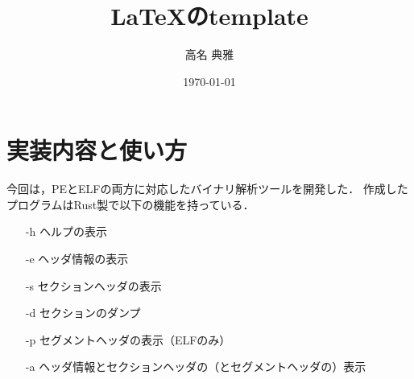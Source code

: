 \documentclass[12pt,a4paper,dvipdfmx]{jsarticle}
\title{\LaTeX のtemplate}
\author{高名 典雅}
\date{\today}
\begin{document}



\section{実装内容と使い方}
今回は，PEとELFの両方に対応したバイナリ解析ツールを開発した．
作成したプログラムはRust製で以下の機能を持っている．
\begin{itemize}
    \item[-h] ヘルプの表示
    \item[-e] ヘッダ情報の表示
    \item[-s] セクションヘッダの表示
    \item[-d] セクションのダンプ
    \item[-p] セグメントヘッダの表示（ELFのみ）
    \item[-a] ヘッダ情報とセクションヘッダの（とセグメントヘッダの）表示
\end{itemize}
\end{document}
